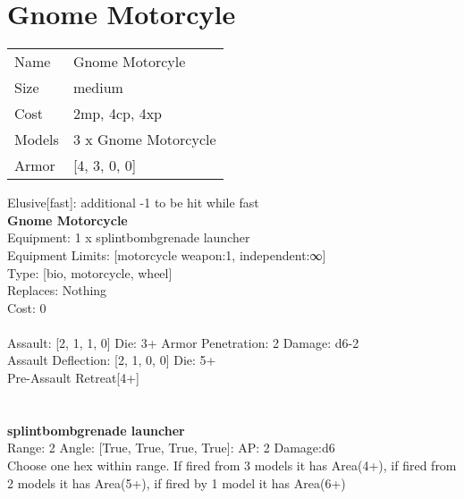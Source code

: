 \pagebreak\pagebreak

\section{ Gnome Motorcyle }

\begin{tabular}{ll}
  Name & Gnome Motorcyle \\
  Size & medium\\
  Cost & 2mp, 4cp, 4xp\\
  Models & 3 x Gnome Motorcycle\\
  Armor & [4, 3, 0, 0]\\
\end{tabular}

\noindent Elusive[fast]: additional -1 to be hit while fast\\ 


{\bf Gnome Motorcycle } \\
Equipment: 1 x splintbombgrenade launcher \\
Equipment Limits: [motorcycle weapon:1, independent:∞] \\
Type: [bio, motorcycle, wheel] \\
Replaces: Nothing \\
Cost: 0\\
\ \\
Assault: [2, 1, 1, 0] Die: 3+ Armor Penetration: 2 Damage: d6-2 \\
Assault Deflection: [2, 1, 0, 0] Die: 5+\\
\indent Pre-Assault Retreat[4+]\\ 
 
\ \\

\ \\
{\bf splintbombgrenade launcher } \\



Range: 2  Angle: [True, True, True, True]: AP: 2 Damage:d6 \\
Choose one hex within range. If fired from 3 models it has Area(4+), if fired from 2 models it has Area(5+), if fired by 1 model it has Area(6+)\\ 




 
\ \\



